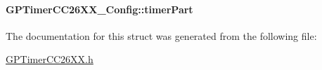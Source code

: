 \paragraph[{timer\+Part}]{ G\+P\+Timer\+C\+C26\+X\+X\+\_\+\+Config\+::timer\+Part}\label{struct_g_p_timer_c_c26_x_x___config_a6d76dc1cbe8a2e7e38a2c6546ea58782}


The documentation for this struct was generated from the following file\+:\begin{DoxyCompactItemize}
\item 
\hyperlink{_g_p_timer_c_c26_x_x_8h}{G\+P\+Timer\+C\+C26\+X\+X.\+h}\end{DoxyCompactItemize}
